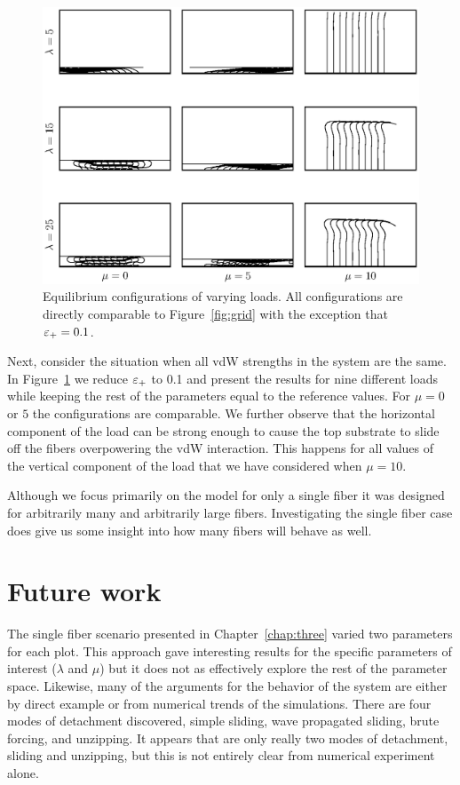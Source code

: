 	\begin{figure}
		\begin{center}
			\includegraphics[scale=1]{./fig/ch4/grid_et0.1.eps}
		\end{center}		
		\caption{Equilibrium configurations of varying loads. All configurations are directly comparable to Figure~\ref{fig:grid} with the exception that $\varepsilon_+ = 0.1$.
		\label{fig:grid_et0.1}}
	\end{figure}

	Next, consider the situation when all vdW strengths in the system are the same. In Figure~\ref{fig:grid_et0.1} we reduce $\varepsilon_+$ to 0.1 and present the results for nine different loads while keeping the rest of the parameters equal to the reference values. For $\mu = 0$ or $5$ the configurations are comparable. We further observe that the horizontal component of the load can be strong enough to cause the top substrate to slide off the fibers overpowering the vdW interaction. This happens for all values of the vertical component of the load that we have considered when $\mu = 10$.
	
	Although we focus primarily on the model for only a single fiber it was designed for arbitrarily many and arbitrarily large fibers. Investigating the single fiber case does give us some insight into how many fibers will behave as well.

\section{Future work}

The single fiber scenario presented in Chapter~\ref{chap:three} varied two parameters for each plot.
This approach gave interesting results for the specific parameters of interest ($\lambda$ and $\mu$) but it does not as effectively explore the rest of the parameter space.
Likewise, many of the arguments for the behavior of the system are either by direct example or from numerical trends of the simulations.
There are four modes of detachment discovered, simple sliding, wave propagated sliding, brute forcing, and unzipping.
It appears that are only really two modes of detachment, sliding and unzipping, but this is not entirely clear from numerical experiment alone.

